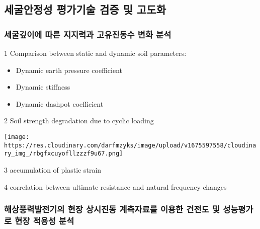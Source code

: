 \documentclass[
  letterpaper,
  DIV=11,
  numbers=noendperiod]{scrreprt}
\providecommand{\tightlist}{%
  \setlength{\itemsep}{0pt}\setlength{\parskip}{0pt}}\usepackage{longtable,booktabs,array}
\begin{document}
\hypertarget{uxc138uxad74uxc548uxc815uxc131-uxd3c9uxac00uxae30uxc220-uxac80uxc99d-uxbc0f-uxace0uxb3c4uxd654}{%
\subsection{세굴안정성 평가기술 검증 및
고도화}\label{uxc138uxad74uxc548uxc815uxc131-uxd3c9uxac00uxae30uxc220-uxac80uxc99d-uxbc0f-uxace0uxb3c4uxd654}}

\hypertarget{uxc138uxad74uxae4auxc774uxc5d0-uxb530uxb978-uxc9c0uxc9c0uxb825uxacfc-uxace0uxc720uxc9c4uxb3d9uxc218-uxbcc0uxd654-uxbd84uxc11d}{%
\subsubsection{세굴깊이에 따른 지지력과 고유진동수 변화
분석}\label{uxc138uxad74uxae4auxc774uxc5d0-uxb530uxb978-uxc9c0uxc9c0uxb825uxacfc-uxace0uxc720uxc9c4uxb3d9uxc218-uxbcc0uxd654-uxbd84uxc11d}}

1 Comparison between static and dynamic soil parameters:

\begin{itemize}
\tightlist
\item
  Dynamic earth pressure coefficient
\item
  Dynamic stiffness
\item
  Dynamic dashpot coefficient
\end{itemize}

2 Soil strength degradation due to cyclic loading

\texttt{[image: https://res.cloudinary.com/darfmzyks/image/upload/v1675597558/cloudinary\_img\_/rbgfxcuyofllzzzf9u67.png]}

3 accumulation of plastic strain

4 correlation between ultimate resistance and natural frequency changes

\hypertarget{uxd574uxc0c1uxd48duxb825uxbc1cuxc804uxae30uxc758-uxd604uxc7a5-uxc0c1uxc2dcuxc9c4uxb3d9-uxacc4uxce21uxc790uxb8ccuxb97c-uxc774uxc6a9uxd55c-uxac74uxc804uxb3c4-uxbc0f-uxc131uxb2a5uxd3c9uxac00uxb85c-uxd604uxc7a5-uxc801uxc6a9uxc131-uxbd84uxc11d}{%
\subsubsection{해상풍력발전기의 현장 상시진동 계측자료를 이용한 건전도
및 성능평가로 현장 적용성
분석}\label{uxd574uxc0c1uxd48duxb825uxbc1cuxc804uxae30uxc758-uxd604uxc7a5-uxc0c1uxc2dcuxc9c4uxb3d9-uxacc4uxce21uxc790uxb8ccuxb97c-uxc774uxc6a9uxd55c-uxac74uxc804uxb3c4-uxbc0f-uxc131uxb2a5uxd3c9uxac00uxb85c-uxd604uxc7a5-uxc801uxc6a9uxc131-uxbd84uxc11d}}
\end{document}
